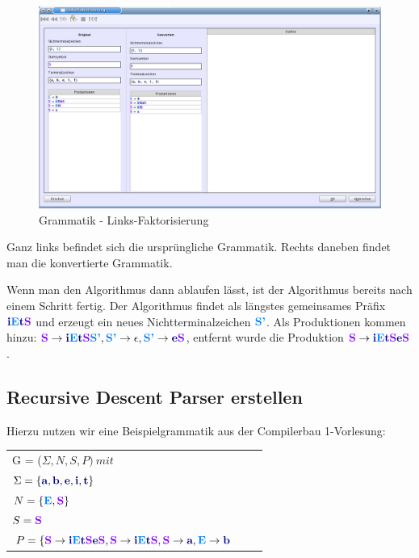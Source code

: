 \begin{figure}[h]
\begin{center}
\includegraphics[width=12cm]{../images/left_factoring.png}
\caption{Grammatik - Links-Faktorisierung}
\end{center}
\end{figure}

Ganz links befindet sich die ursprüngliche Grammatik. Rechts daneben findet man die konvertierte Grammatik.

Wenn man den Algorithmus dann ablaufen lässt, ist der Algorithmus bereits nach einem Schritt fertig. Der Algorithmus findet als längstes gemeinsames Präfix $\TerminalSymbol{i}\NonterminalSymbol{E}\TerminalSymbol{t}\StartSymbol{S}$ und erzeugt ein neues Nichtterminalzeichen $\NonterminalSymbol{S'}$. Als Produktionen kommen hinzu: $\StartSymbol{S} \to \TerminalSymbol{i}\NonterminalSymbol{E}\TerminalSymbol{t}\StartSymbol{S}\NonterminalSymbol{S'}, \NonterminalSymbol{S'} \to \epsilon, \NonterminalSymbol{S'} \to \TerminalSymbol{e}\StartSymbol{S}$, entfernt wurde die Produktion $\StartSymbol{S} \to \TerminalSymbol{i}\NonterminalSymbol{E}\TerminalSymbol{t}\StartSymbol{S}\TerminalSymbol{e}\StartSymbol{S}$.

\subsection{Recursive Descent Parser erstellen}

Hierzu nutzen wir eine Beispielgrammatik aus der Compilerbau 1-Vorlesung:

\begin{tabular}{lcr}
G = ($\Sigma, N, S, P )\ mit $\\
$\Sigma = \{\TerminalSymbol{a}, \TerminalSymbol{b}, \TerminalSymbol{e},
\TerminalSymbol{i},\TerminalSymbol{t}\}$\\ $N =
\{\NonterminalSymbol{E}, \StartSymbol{S}\}$\\ $S=\StartSymbol{S}$\\
$P = \{\StartSymbol{S} \to \TerminalSymbol{i}\NonterminalSymbol{E}\TerminalSymbol{t}\StartSymbol{S}\TerminalSymbol{e}\StartSymbol{S},\StartSymbol{S} \to \TerminalSymbol{i}\NonterminalSymbol{E}\TerminalSymbol{t}\StartSymbol{S}, \StartSymbol{S} \to \TerminalSymbol{a}, \NonterminalSymbol{E} \to \TerminalSymbol{b}$\\
\end{tabular}

